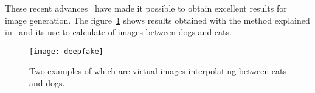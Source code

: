 These recent advances~\cite{goodfellow2014generative} have made it possible to obtain excellent results for image generation.
%
The figure~\ref{fig:deepfake} shows results obtained with the method explained in~\cite{brock2018large} and its use to calculate  of images between dogs and cats.

\begin{figure}\centering
	\texttt{[image: deepfake]}
\caption{\label{fig:deepfake} Two examples of  which are virtual images interpolating between cats and dogs. }
\end{figure}



